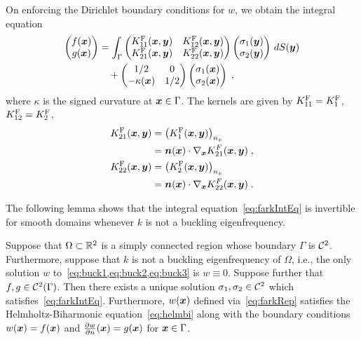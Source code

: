 On enforcing the Dirichlet boundary conditions for
$w$, we obtain the integral equation
\begin{equation}
  \begin{split}
    \begin{pmatrix}
      f({\boldsymbol x}) \\
      g({\boldsymbol x})
    \end{pmatrix} &= 
    \int_\Gamma
    \begin{pmatrix}
      K^{\textrm{F}}_{11}({\boldsymbol x},{\boldsymbol y}) & K^{\textrm{F}}_{12}({\boldsymbol x},{\boldsymbol y}) \\
      K^{\textrm{F}}_{21}({\boldsymbol x},{\boldsymbol y}) & K^{\textrm{F}}_{22}({\boldsymbol x},{\boldsymbol y})
    \end{pmatrix}
    \begin{pmatrix}
      \sigma_1({\boldsymbol y})\\
      \sigma_2({\boldsymbol y})
    \end{pmatrix}
    \, dS({\boldsymbol y}) \\
    &\quad + \begin{pmatrix}
      1/2 & 0 \\
      -\kappa({\boldsymbol x}) & 1/2
    \end{pmatrix}
    \begin{pmatrix}
      \sigma_1({\boldsymbol x})\\
      \sigma_2({\boldsymbol x})
    \end{pmatrix} \; , \label{eq:farkIntEq} 
  \end{split}
\end{equation}
where $\kappa$ is the signed curvature at ${\boldsymbol x} \in \Gamma$.
The kernels are given
by $K^{\textrm{F}}_{11} = K^{\textrm{F}}_1$, $K^{\textrm{F}}_{12} = K^{\textrm{F}}_2$,
\begin{align}
  K^{\textrm{F}}_{21}({\boldsymbol x},{\boldsymbol y}) &= \left(K^{\textrm{F}}_1({\boldsymbol x},{\boldsymbol y})\right )_{n_x} \nonumber \\
  &= {\boldsymbol n}({\boldsymbol x}) \cdot \nabla_{{\boldsymbol x}} K_{21}^{F}({\boldsymbol x},{\boldsymbol y}) \; \label{eq:farkK21},\\
  K^{\textrm{F}}_{22}({\boldsymbol x},{\boldsymbol y}) &= \left(K^{\textrm{F}}_2({\boldsymbol x},{\boldsymbol y})\right )_{n_x} \nonumber \\
  &= {\boldsymbol n}({\boldsymbol x}) \cdot \nabla_{{\boldsymbol x}} K_{22}^{F}({\boldsymbol x},{\boldsymbol y}) \label{eq:farkK22} \; .
\end{align}

The following lemma shows that the integral equation~\cref{eq:farkIntEq} is invertible for smooth domains
whenever $k$ is not a buckling eigenfrequency. 

\begin{lem}
Suppose that $\Omega \subset \mathbb{R}^2$ is a simply connected region whose boundary $\Gamma$ is $\mathcal C^{2}$. 
Furthermore, suppose that $k$ is not a buckling eigenfrequency of $\Omega$, i.e., the only solution $w$ to~\cref{eq:buck1,eq:buck2,eq:buck3} is  $w \equiv 0$. Suppose further that $f,g \in \mathcal C^{2}(\Gamma)$. 
Then there exists a unique solution $\sigma_{1},\sigma_{2} \in \mathcal C^{2}$ which satisfies~\cref{eq:farkIntEq}. 
Furthermore, $w({\boldsymbol x})$ defined via~\cref{eq:farkRep} satisfies the Helmholtz-Biharmonic equation~\cref{eq:helmbi}
along with the boundary conditions $w({\boldsymbol x})=f({\boldsymbol x})$ and $\frac{\partial w}{\partial n}({\boldsymbol x}) = g({\boldsymbol x})$ for ${\boldsymbol x} \in\Gamma$.
\label{lem:farkinv}
\end{lem}


